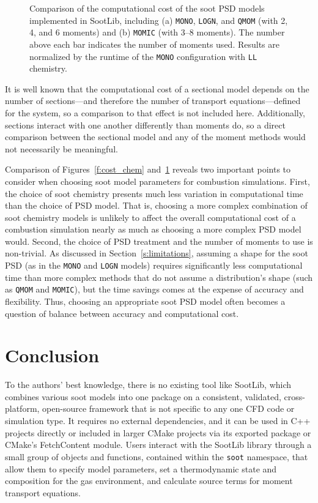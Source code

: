\documentclass[preprint,letterpaper]{elsarticle}
\begin{document}
\begin{figure}
\begin{minipage}{0.5\textwidth}
    \end{minipage}
    \caption{Comparison of the computational cost of the soot PSD models implemented in SootLib, including (a) \texttt{MONO}, \texttt{LOGN}, and \texttt{QMOM} (with 2, 4, and 6 moments) and (b) \texttt{MOMIC} (with 3--8 moments). The number above each bar indicates the number of moments used. Results are normalized by the runtime of the \texttt{MONO} configuration with \texttt{LL} chemistry.}
    \label{f:cost_PSD}
\end{figure}

It is well known that the computational cost of a sectional model depends on the number of sections---and therefore the number of transport equations---defined for the system, so a comparison to that effect is not included here. Additionally, sections interact with one another differently than moments do, so a direct comparison between the sectional model and any of the moment methods would not necessarily be meaningful.

Comparison of Figures~\ref{f:cost_chem} and~\ref{f:cost_PSD} reveals two important points to consider when choosing soot model parameters for combustion simulations. First, the choice of soot chemistry presents much less variation in computational time than the choice of PSD model. That is, choosing a more complex combination of soot chemistry models is unlikely to affect the overall computational cost of a combustion simulation nearly as much as choosing a more complex PSD model would. Second, the choice of PSD treatment and the number of moments to use is non-trivial. As discussed in Section~\ref{s:limitations}, assuming a shape for the soot PSD (as in the \texttt{MONO} and \texttt{LOGN} models) requires significantly less computational time than more complex methods that do not assume a distribution's shape (such as \texttt{QMOM} and \texttt{MOMIC}), but the time savings comes at the expense of accuracy and flexibility. Thus, choosing an appropriate soot PSD model often becomes a question of balance between accuracy and computational cost.


\section{Conclusion}
\label{s:soot-conclusion}

To the authors' best knowledge, there is no existing tool like SootLib, which combines various soot models into one package on a consistent, validated, cross-platform, open-source framework that is not specific to any one CFD code or simulation type. It requires no external dependencies, and it can be used in C++ projects directly or included in larger CMake projects via its exported package or CMake's FetchContent module. Users interact with the SootLib library through a small group of objects and functions, contained within the \texttt{soot} namespace, that allow them to specify model parameters, set a thermodynamic state and composition for the gas environment, and calculate source terms for moment transport equations.
\end{document}
